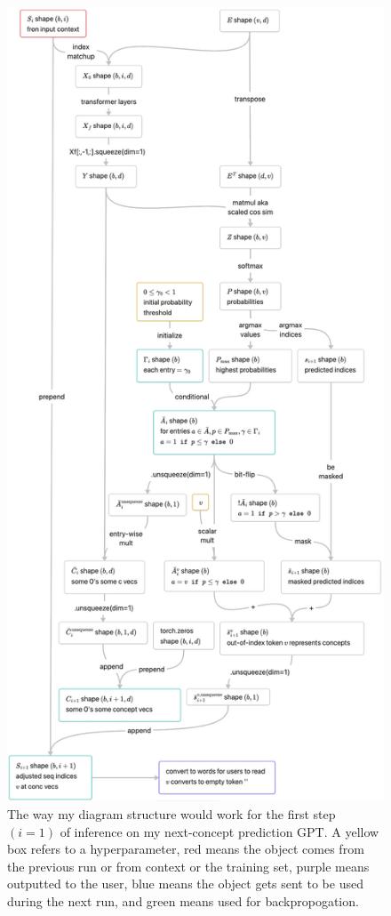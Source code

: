 \documentclass{article}
\begin{document}
\begin{figure}[!htb]
    \centering
    \includegraphics[height=0.86\textheight]{NCP_i=1_inf.png}
    \caption{The way my diagram structure would work for the first step $(i=1)$ of inference on my next-concept prediction GPT. A yellow box refers to a hyperparameter, red means the object comes from the previous run or from context or the training set, purple means outputted to the user, blue means the object gets sent to be used during the next run, and green means used for backpropogation.}
    \label{fig:ncp_i=1_inf}
\end{figure}
\end{document}
